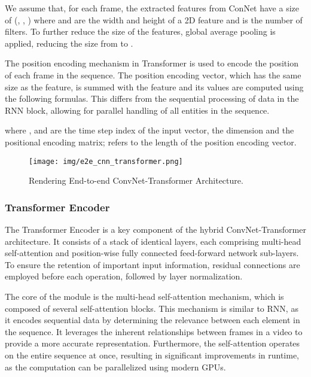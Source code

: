 \documentclass[fleqn,10pt]{wlscirep}
\begin{document}
We assume that, for each frame, the extracted features from ConNet have a size of (, , ) where  and  are the width and height of a 2D feature and  is the number of filters. To further reduce the size of the features, global average pooling is applied, reducing the size from  to .

The position encoding mechanism in Transformer is used to encode the position of each frame in the sequence. The position encoding vector, which has the same size as the feature, is summed with the feature and its values are computed using the following formulas. This differs from the sequential processing of data in the RNN block, allowing for parallel handling of all entities in the sequence.

where ,  and  are the time step index of the input vector, the dimension and the positional encoding matrix;  refers to the length of the position encoding vector.
\begin{figure}[htb!]
\begin{center}
\texttt{[image: img/e2e\_cnn\_transformer.png]}
\caption{Rendering End-to-end ConvNet-Transformer Architecture.}
\label{fig:e2e_cnn_transformer}
\end{center}
\end{figure}
\subsubsection{Transformer Encoder}


The Transformer Encoder is a key component of the hybrid ConvNet-Transformer architecture. It consists of a stack of  identical layers, each comprising multi-head self-attention and position-wise fully connected feed-forward network sub-layers. To ensure the retention of important input information, residual connections are employed before each operation, followed by layer normalization.



The core of the module is the multi-head self-attention mechanism, which is composed of several self-attention blocks. This mechanism is similar to RNN, as it encodes sequential data by determining the relevance between each element in the sequence. It leverages the inherent relationships between frames in a video to provide a more accurate representation. Furthermore, the self-attention operates on the entire sequence at once, resulting in significant improvements in runtime, as the computation can be parallelized using modern GPUs.
\end{document}
